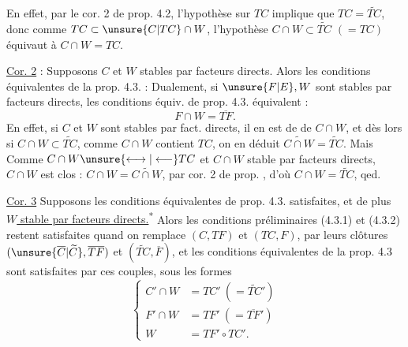 En effet, par le cor. 2 de prop. 4.2, l'hypothèse sur $TC$ implique que $TC=\widetilde{TC}$, donc comme $TC\subset\unsure{C|TC}\cap W$, l'hypothèse $C\cap W\subset\widetilde{TC}$ $(=TC)$ équivaut à $C\cap W=TC$.

\uline{Cor. 2} : Supposons $C$ et $W$ stables par facteurs directs. Alors les conditions équivalentes de la prop. 4.3.  :
Dualement, si $\unsure{F|E},W$ sont stables par facteurs directs, les conditions équiv. de prop. 4.3. équivalent :
\[
F\cap W=\overline{TF}.
\tag*{(4.3.5')}
\]
En effet, si $C$ et $W$ sont stables par fact. directs, il en est de  de $C\cap W$, et  dès lors si $C\cap W\subset\widetilde{TC}$, comme $C\cap W$ contient $TC$,  on en déduit $\widetilde{C\cap W}=\widetilde{TC}$. Mais  Comme $C\cap W\unsure{\longleftrightarrow|\longleftarrow}TC$ et $C\cap W$ stable par facteurs directs, $C\cap W$ est clos :   $C\cap W=\widetilde{C\cap W}$, par cor. 2 de prop. , d'où $C\cap W=\widetilde{TC}$, qed.

\uline{Cor. 3} Supposons les conditions équivalentes  de prop. 4.3. satisfaites, et de plus \uline{$W$ stable par facteurs directs.}\textsuperscript{*} Alors les conditions préliminaires (4.3.1) et (4.3.2) restent satisfaites quand on remplace $(C,TF)$ et $(TC,F)$, par leurs clôtures  $(\unsure{\overline C|\widetilde C},\overline{TF})$ et  $(\widetilde{TC},\overline F)$, et les conditions  équivalentes de la prop. 4.3 sont  satisfaites par ces couples, sous les formes 
\[
\left\{\begin{aligned}
C'\cap W&=TC'\ (=\widetilde{TC}')\\
F'\cap W&=TF'\ (=\overline{TF}')\\
W&=TF'\circ TC'.
\end{aligned}\right.
\tag*{(4.3.6)}
\]
